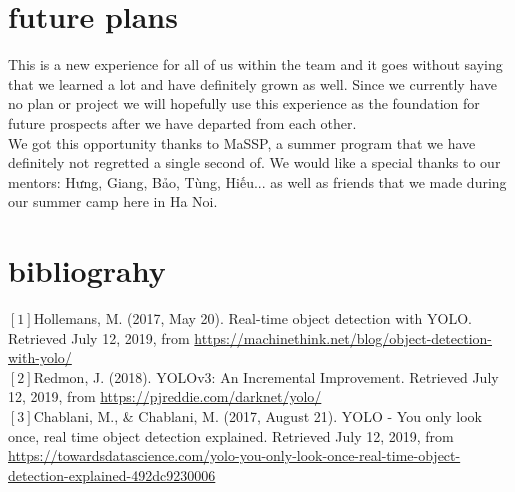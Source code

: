 \documentclass{article}
\begin{document}
\section{future plans}
This is a new experience for all of us within the team and it goes without saying that we learned a lot and have definitely grown as well. Since we currently have no plan or project we will hopefully use this experience as the foundation for future prospects after we have departed from each other.\\
We got this opportunity thanks to MaSSP, a summer program that we have definitely not regretted a single second of. We would like a special thanks to our mentors: Hưng, Giang, Bảo, Tùng, Hiếu... as well as friends that we made during our summer camp here in Ha Noi.

\section{bibliograhy}
$[1]$Hollemans, M. (2017, May 20). Real-time object detection with YOLO. Retrieved July 12, 2019, from \url{https://machinethink.net/blog/object-detection-with-yolo/}\\
$[2]$Redmon, J. (2018). YOLOv3: An Incremental Improvement. Retrieved July 12, 2019, from \url{https://pjreddie.com/darknet/yolo/}\\
$[3]$Chablani, M., \& Chablani, M. (2017, August 21). YOLO - You only look once, real time object detection explained. Retrieved July 12, 2019, from \url{https://towardsdatascience.com/yolo-you-only-look-once-real-time-object-detection-explained-492dc9230006}
\end{document}
